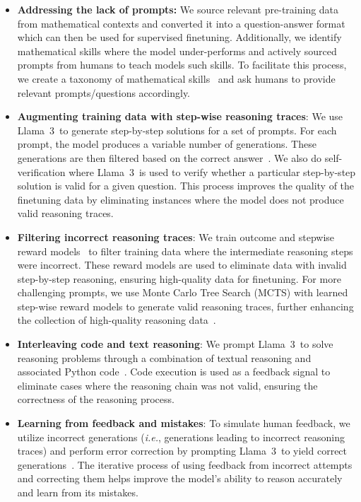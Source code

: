 \begin{itemize}
    \item \textbf{Addressing the lack of prompts:} We source relevant pre-training data from mathematical contexts and converted it into a question-answer format which can then be used for supervised finetuning. Additionally, we identify mathematical skills where the model under-performs and actively sourced prompts from humans to teach models such skills. To facilitate this process, we create a taxonomy of mathematical skills~\citep{didolkar2024metacognitive} and ask humans to provide relevant prompts/questions accordingly.
    \item \textbf{Augmenting training data with step-wise reasoning traces}: We use Llama~3~to generate step-by-step solutions for a set of prompts. For each prompt, the model produces a variable number of generations. These generations are then filtered based on the correct answer~\citep{li2024common}. We also do self-verification where Llama~3~is used to verify whether a particular step-by-step solution is valid for a given question. This process improves the quality of the finetuning data by eliminating instances where the model does not produce valid reasoning traces.
    \item \textbf{Filtering incorrect reasoning traces}:  We train outcome and stepwise reward models~\citep{lightman2023let, wang2023math} to filter training data where the intermediate reasoning steps were incorrect. These reward models are used to eliminate data with invalid step-by-step reasoning, ensuring high-quality data for finetuning. For more challenging prompts, we use Monte Carlo Tree Search (MCTS) with learned step-wise reward models to generate valid reasoning traces, further enhancing the collection of high-quality reasoning data~\citep{xie2024monte}.
    \item \textbf{Interleaving code and text reasoning}:  We prompt Llama~3~to solve reasoning problems through a combination of textual reasoning and associated Python code~\citep{gou2023tora}. Code execution is used as a feedback signal to eliminate cases where the reasoning chain was not valid, ensuring the correctness of the reasoning process.
    \item \textbf{Learning from feedback and mistakes}: To simulate human feedback, we utilize incorrect generations (\emph{i.e.}, generations leading to incorrect reasoning traces) and perform error correction by prompting Llama~3~to yield correct generations~\citep{an2023learning, welleck2022generating, madaan2024self}. The iterative process of using feedback from incorrect attempts and correcting them helps improve the model's ability to reason accurately and learn from its mistakes.
\end{itemize}

